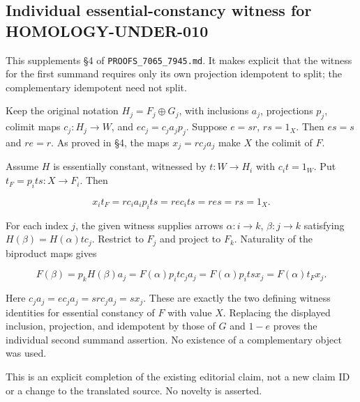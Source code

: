 \subsection{Individual essential-constancy witness for HOMOLOGY-UNDER-010}\label{individual-essential-constancy-witness-for-homology-under-010}

This supplements §4 of \texttt{PROOFS\_7065\_7945.md}. It makes explicit that the witness for the first summand requires only its own projection idempotent to split; the complementary idempotent need not split.

Keep the original notation \(H_j=F_j\oplus G_j\), with inclusions \(a_j\), projections \(p_j\), colimit maps \(c_j:H_j\to W\), and \(e c_j=c_j a_jp_j\). Suppose \(e=sr\), \(rs=1_X\). Then \(es=s\) and \(re=r\). As proved in §4, the maps \(x_j=rc_ja_j\) make \(X\) the colimit of \(F\).

Assume \(H\) is essentially constant, witnessed by \(t:W\to H_i\) with \(c_i t=1_W\). Put \(t_F=p_i t s:X\to F_i\). Then

\[
x_i t_F=r c_i a_i p_i t s
       =r e c_i t s=r e s=rs=1_X.
\]

For each index \(j\), the given witness supplies arrows \(\alpha:i\to k\), \(\beta:j\to k\) satisfying \(H(\beta)=H(\alpha)t c_j\). Restrict to \(F_j\) and project to \(F_k\). Naturality of the biproduct maps gives

\[
F(\beta)=p_kH(\beta)a_j
=F(\alpha)p_i t c_j a_j
=F(\alpha)p_i t s x_j
=F(\alpha)t_F x_j.
\]

Here \(c_j a_j=e c_j a_j=s r c_j a_j=sx_j\). These are exactly the two defining witness identities for essential constancy of \(F\) with value \(X\). Replacing the displayed inclusion, projection, and idempotent by those of \(G\) and \(1-e\) proves the individual second summand assertion. No existence of a complementary object was used.

This is an explicit completion of the existing editorial claim, not a new claim ID or a change to the translated source. No novelty is asserted.

